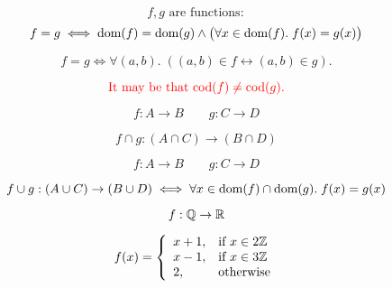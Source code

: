 
\begin{frame}{}
  \begin{center}
  \end{center}
\end{frame}

\begin{frame}{}
  \begin{theorem}
    \[
      f, g \text{ are functions}:
    \]
    \[
      f = g \iff \text{dom}(f) = \text{dom}(g)
        \land \big(\forall x \in \text{dom}(f).\; f(x) = g(x) \big)
    \]
  \end{theorem}

  \pause
  \[
    f = g \iff \forall (a, b).\; ((a, b) \in f \leftrightarrow (a, b) \in g).
  \]

  \pause
  \[
    \textcolor{red}{\text{It may be that } \text{cod}(f) \neq \text{cod}(g).}
  \]
\end{frame}

\begin{frame}{}
  \[
    f: A \to B \qquad g: C \to D
  \]

  \begin{center}
  \end{center}

  \pause
  \begin{theorem}
    \[
      f \cap g: (A \cap C) \to (B \cap D)
    \]
  \end{theorem}
\end{frame}

\begin{frame}{}
  \[
    f: A \to B \qquad g: C \to D
  \]

  \begin{center}
  \end{center}

  \pause
  \begin{theorem}
    {\[
      f \cup g: (A \cup C) \to (B \cup D) \iff
      \forall x \in \text{dom}(f) \cap \text{dom}(g).\; f(x) = g(x)
    \]}
  \end{theorem}

  \pause
  \begin{exampleblock}{}
    \[
      f: \mathbb{Q} \to \mathbb{R}
    \]

    \[
      f(x) = \left\{\begin{array}{ll}
        x + 1, & \text{if } x \in 2\mathbb{Z}{} \\
        x - 1, & \text{if } x \in 3\mathbb{Z}{} \\
        2,     & \text{otherwise}
      \end{array}\right.
    \]
  \end{exampleblock}
\end{frame}


